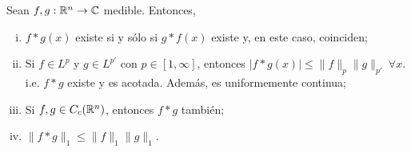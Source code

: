 \begin{theorem}
	Sean $f,g : \mathbb{R}^{n} \to \mathbb{C}$ medible. Entonces,
	\begin{enumerate}[i.]
		\item $f * g (x)$ existe si y sólo si $g * f (x)$ existe y, en este caso, coinciden;

		\item Si $f \in L^{p}$ y $g \in L^{p'}$ con $p \in [1, \infty]$, entonces $|f * g (x)| \leq \| f \|_{p} \| g \|_{p'} \ \forall x$. i.e. $f * g$ existe y es acotada. Además, es uniformemente continua;

		\item Si $f,g \in C_{c}(\mathbb{R}^{n})$, entonces $f * g$ también;

		\item $\| f * g \|_{1} \leq \| f \|_{1} \| g \|_{1}$.
	\end{enumerate}
\end{theorem}
